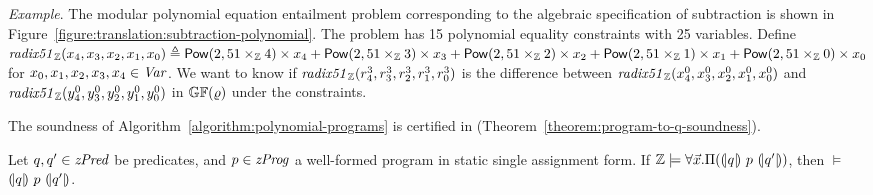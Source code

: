 \noindent
\emph{Example}.
The modular polynomial equation entailment problem corresponding to the
algebraic specification of subtraction is shown in
Figure~\ref{figure:translation:subtraction-polynomial}. The problem
has 15 polynomial equality constraints with 25 variables.
Define $\mathit{radix51}_{\mathbb{Z}}({x}_4, {x}_3, {x}_2, {x}_1, {x}_0) \triangleq \mbox{\textsf{Pow}}(2, 51 \times_{\mathbb{Z}} 4) \times {x}_4 + \mbox{\textsf{Pow}}(2, 51 \times_{\mathbb{Z}} 3) \times {x}_3 + \mbox{\textsf{Pow}}(2, 51 \times_{\mathbb{Z}} 2) \times {x}_2 + \mbox{\textsf{Pow}}(2, 51 \times_{\mathbb{Z}} 1) \times {x}_1 + \mbox{\textsf{Pow}}(2, 51 \times_{\mathbb{Z}} 0) \times {x}_0$ for ${x}_0, {x}_1, {x}_2, {x}_3, {x}_4 \in \mathit{Var}$.
We want to know if $\mathit{radix51}_{\mathbb{Z}}({r}^3_4, {r}^3_3, {r}^3_2,
{r}^3_1, {r}^3_0)$ is the difference between $\mathit{radix51}_{\mathbb{Z}}({x}^0_4,
{x}^0_3, {x}^0_2, {x}^0_1, {x}^0_0)$ and $\mathit{radix51}_{\mathbb{Z}}({y}^0_4,
{y}^0_3, {y}^0_2, {y}^0_1, {y}^0_0)$ in $\mathbb{GF}(\varrho)$ under the
constraints.

The soundness of Algorithm~\ref{algorithm:polynomial-programs}
is certified in \coq (Theorem~\ref{theorem:program-to-q-soundness}).
\begin{theorem}
  \label{theorem:program-to-q-soundness}
  Let $q, q' \in \mathit{zPred}$ be predicates, and $p \in \mathit{zProg}$ a well-formed
  program in static single assignment form.
  If $\mathbb{Z} \models \forall \vec{x}.\Pi({(\!|}{q}{|\!)}~{p}~{(\!|}{q'}{|\!)})$, then
  $\models$ ${(\!|}{q}{|\!)}~{p}~{(\!|}{q'}{|\!)}$.
\end{theorem}
